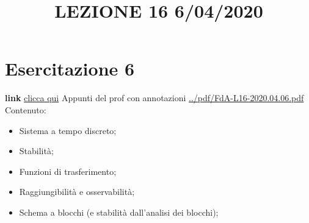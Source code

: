 \section{Esercitazione 6}
\title{LEZIONE 16 6/04/2020}\newline
\textbf{link} \href{https://web.microsoftstream.com/video/0384d9d2-5ddc-4381-8933-f46dc8fca4d3?list=user&userId=faa91214-a6f5-40d7-8875-253fd49b8ce1}{clicca qui}\newline
\newline
Appunti del prof con annotazioni \url{../pdf/FdA-L16-2020.04.06.pdf}\newline
Contenuto:
\begin{itemize}
    \item Sistema a tempo discreto;
    \item Stabilità;
    \item Funzioni di trasferimento;
    \item Raggiungibilità e osservabilità;
    \item Schema a blocchi (e stabilità dall'analisi dei blocchi);
\end{itemize}